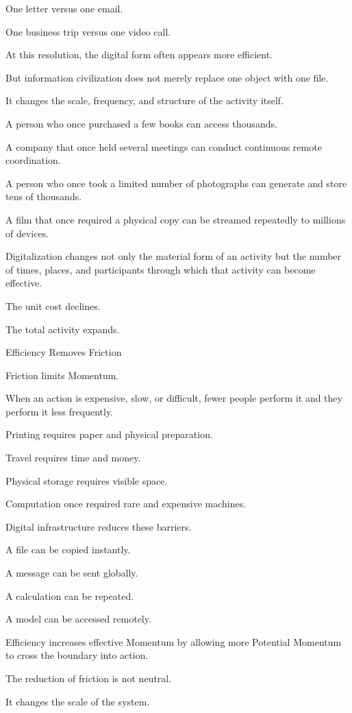 One letter versus one email.

One business trip versus one video call.

At this resolution, the digital form often appears more efficient.

But information civilization does not merely replace one object with one file.

It changes the scale, frequency, and structure of the activity itself.

A person who once purchased a few books can access thousands.

A company that once held several meetings can conduct continuous remote coordination.

A person who once took a limited number of photographs can generate and store tens of thousands.

A film that once required a physical copy can be streamed repeatedly to millions of devices.

Digitalization changes not only the material form of an activity but the number of times, places, and participants through which that activity can become effective.

The unit cost declines.

The total activity expands.

Efficiency Removes Friction

Friction limits Momentum.

When an action is expensive, slow, or difficult, fewer people perform it and they perform it less frequently.

Printing requires paper and physical preparation.

Travel requires time and money.

Physical storage requires visible space.

Computation once required rare and expensive machines.

Digital infrastructure reduces these barriers.

A file can be copied instantly.

A message can be sent globally.

A calculation can be repeated.

A model can be accessed remotely.

Efficiency increases effective Momentum by allowing more Potential Momentum to cross the boundary into action.

The reduction of friction is not neutral.

It changes the scale of the system.

